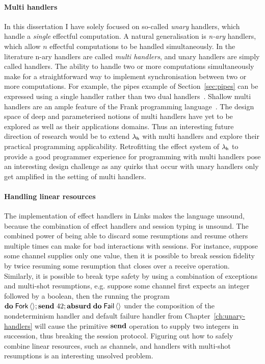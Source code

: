 \documentclass[12pt,phd,lfcs,twoside,openright,logo,leftchapter,normalheadings]{infthesis}
\theoremstyle{plain}
\theoremstyle{definition}
\begin{document}
\paragraph{Multi handlers} In this dissertation I have solely focused
on so-called \emph{unary} handlers, which handle a \emph{single}
effectful computation. A natural generalisation is \emph{n-ary}
handlers, which allow $n$ effectful computations to be handled
simultaneously. In the literature n-ary handlers are called
\emph{multi handlers}, and unary handlers are simply called
handlers. The ability to handle two or more computations
simultaneously make for a straightforward way to implement
synchronisation between two or more computations. For example, the
pipes example of Section~\ref{sec:pipes} can be expressed using a
single handler rather than two dual
handlers~\cite{LindleyMM17}. Shallow multi handlers are an ample
feature of the Frank programming language~\cite{LindleyMM17}.  The
design space of deep and parameterised notions of multi handlers have
yet to be explored as well as their applications domains. Thus an
interesting future direction of research would be to extend $\lambda_{\mathsf{h}}$
with multi handlers and explore their practical programming
applicability. Retrofitting the effect system of $\lambda_{\mathsf{h}}$ to provide a
good programmer experience for programming with multi handlers pose an
interesting design challenge as any quirks that occur with unary
handlers only get amplified in the setting of multi handlers.

\paragraph{Handling linear resources} The implementation of effect
handlers in Links makes the language unsound, because the \naive{}
combination of effect handlers and session typing is unsound. The
combined power of being able to discard some resumptions and resume
others multiple times can make for bad interactions with sessions. For
instance, suppose some channel supplies only one value, then it is
possible to break session fidelity by twice resuming some resumption
that closes over a receive operation. Similarly, it is possible to
break type safety by using a combination of exceptions and multi-shot
resumptions, e.g. suppose some channel first expects an integer
followed by a boolean, then the running the program
$\mathbf{do}\;\mathsf{Fork}\,\langle  \rangle;\mathbf{send}~42;\mathbf{absurd}\;\mathbf{do}\;\mathsf{Fail}\,\langle  \rangle$ under
the composition of the nondeterminism handler and default failure
handler from Chapter~\ref{ch:unary-handlers} will cause the primitive
$\mathbf{send}$ operation to supply two integers in succession, thus
breaking the session protocol. Figuring out how to safely combine
linear resources, such as channels, and handlers with multi-shot
resumptions is an interesting unsolved problem.
\end{document}
